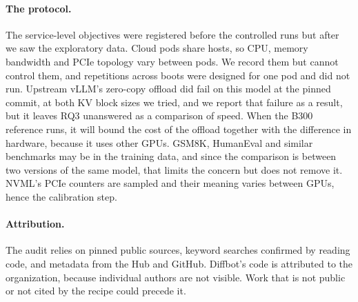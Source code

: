 \paragraph{The protocol.}
The service-level objectives were registered before the controlled runs but after we saw the exploratory data. Cloud
pods share hosts, so CPU, memory bandwidth and PCIe topology vary between pods. We record them but cannot control
them, and repetitions across boots were designed for one pod and did not run. Upstream vLLM's zero-copy offload did
fail on this model at the pinned commit, at both KV block sizes we tried, and we report that failure as a result, but
it leaves RQ3 unanswered as a comparison of speed. When the B300 reference runs, it will bound the cost of the offload
together with the difference in hardware, because it uses other GPUs. GSM8K, HumanEval and similar benchmarks may be
in the training data, and since the comparison is between two versions of the same model, that limits the concern but
does not remove it. NVML's PCIe counters are sampled and their meaning varies between GPUs, hence the calibration
step.

\paragraph{Attribution.}
The audit relies on pinned public sources, keyword searches confirmed by reading code, and metadata from the Hub and
GitHub. Diffbot's code is attributed to the organization, because individual authors are not visible. Work that is
not public or not cited by the recipe could precede it.

